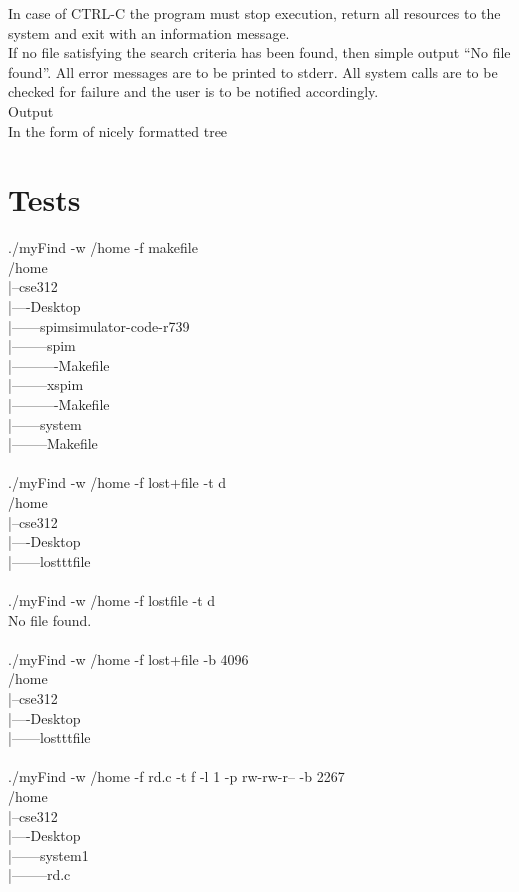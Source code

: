 \documentclass{article}
\begin{document}
In case of CTRL-C the program must stop execution, return all resources to the system and exit with an information message.\\

If no file satisfying the search criteria has been found, then simple output “No file found”. All error messages are to be printed to stderr. All system calls are to be checked for failure and the user is to be notified accordingly.\\

Output\\
In the form of nicely formatted tree

\section{Tests}
./myFind -w /home -f makefile\\
/home\\
|--cse312\\
|----Desktop\\
|------spimsimulator-code-r739\\
|--------spim\\
|----------Makefile\\
|--------xspim\\
|----------Makefile\\
|------system\\
|--------Makefile\\
\\

./myFind -w /home -f lost+file -t d\\
/home\\
|--cse312\\
|----Desktop\\
|------lostttfile\\
\\

./myFind -w /home -f lostfile -t d\\
No file found.\\
\\

./myFind -w /home -f lost+file -b 4096\\
/home\\
|--cse312\\
|----Desktop\\
|------lostttfile\\
\\

./myFind -w /home -f rd.c -t f -l 1 -p rw-rw-r-- -b 2267\\
/home\\
|--cse312\\
|----Desktop\\
|------system1\\
|--------rd.c\\
\\
\end{document}
